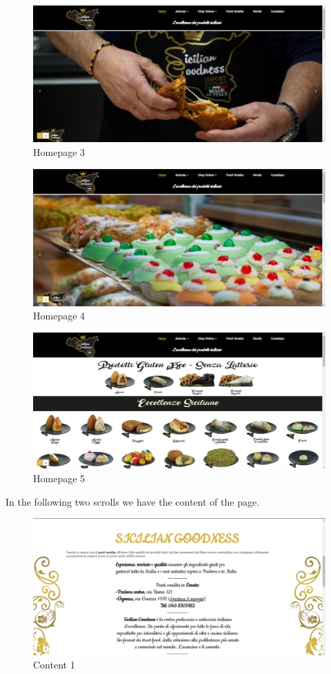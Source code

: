 \begin{figure}[H]
	\centering\includegraphics[width=12cm]{Img/hom3.png}
	\caption{Homepage 3}
\end{figure}

\begin{figure}[H]
	\centering\includegraphics[width=12cm]{Img/hom4.png}
	\caption{Homepage 4}
\end{figure}

\begin{figure}[H]
	\label{hom5}
	\centering\includegraphics[width=12cm]{Img/hom5.png}
	\caption{Homepage 5}
\end{figure}

\pagebreak

In the following two scrolls we have the content of the page.

\begin{figure}[H]
	\centering\includegraphics[width=12cm]{Img/content1.png}
	\caption{Content 1}
\end{figure}

